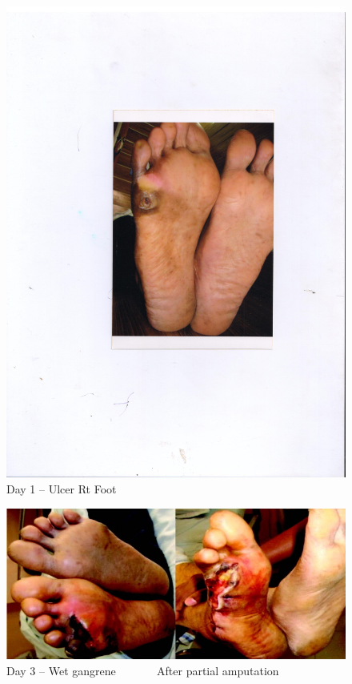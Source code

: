 \begin{figure}
\includegraphics{images/069.jpg}
\caption{Day 1 – Ulcer Rt Foot}
\end{figure}


\begin{figure}
\includegraphics{images/070.jpg}
\caption{Day 3 – Wet gangrene         After partial amputation}
\end{figure}

